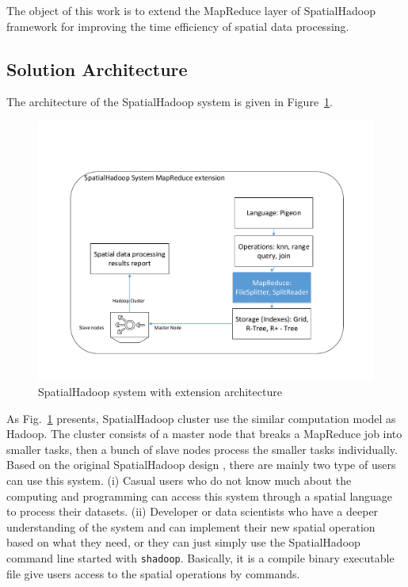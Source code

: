 The object of this work is to extend the MapReduce layer of SpatialHadoop framework for improving the time efficiency of spatial data processing.


\subsection{Solution Architecture}
\label{subsec:architecture}

The architecture of the SpatialHadoop system is given in Figure~\ref{fig:architecture}.
\begin{figure}[htb!]
\centering
\includegraphics[width=0.90\columnwidth]{figures/architecture.pdf}
\caption{SpatialHadoop system with extension architecture}
\label{fig:architecture}
\end{figure}


As Fig.~\ref{fig:architecture} presents, SpatialHadoop cluster use the similar computation model as Hadoop. The cluster consists of a master node that breaks a MapReduce job into smaller tasks, then a bunch of slave nodes process the smaller tasks individually. Based on the original SpatialHadoop design \cite{eldawy2015spatialhadoop}, there are mainly two type of users can use this system. (i) Casual users who do not know much about the computing and programming can access this system through a spatial language to process their datasets. (ii) Developer or data scientists who have a deeper understanding of the system and can implement their new spatial operation based on what they need, or they can just simply use the SpatialHadoop command line started with \texttt{shadoop}. Basically, it is a compile binary executable file give users access to the spatial operations by commands. 

